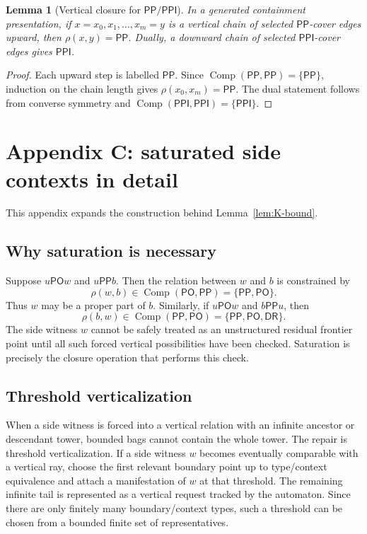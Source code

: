 \documentclass[11pt]{article}
\newtheorem{lemma}[theorem]{Lemma}
\newcommand{\PP}{\mathsf{PP}}
\newcommand{\PPI}{\mathsf{PPI}}
\newcommand{\PO}{\mathsf{PO}}
\newcommand{\DR}{\mathsf{DR}}
\newcommand{\Comp}{\operatorname{Comp}}
\begin{document}
\begin{lemma}[Vertical closure for $\PP/\PPI$]
In a generated containment presentation, if $x=x_0,x_1,\ldots,x_m=y$ is a vertical chain of selected $\PP$-cover edges upward, then $\rho(x,y)=\PP$.  Dually, a downward chain of selected $\PPI$-cover edges gives $\PPI$.
\end{lemma}

\begin{proof}
Each upward step is labelled $\PP$.  Since $\Comp(\PP,\PP)=\{\PP\}$, induction on the chain length gives $\rho(x_0,x_m)=\PP$.  The dual statement follows from converse symmetry and $\Comp(\PPI,\PPI)=\{\PPI\}$.
\end{proof}

\section{Appendix C: saturated side contexts in detail}

This appendix expands the construction behind Lemma~\ref{lem:K-bound}.

\subsection{Why saturation is necessary}

Suppose $u\PO w$ and $u\PP b$.  Then the relation between $w$ and $b$ is constrained by
\[
\rho(w,b)\in\Comp(\PO,\PP)=\{\PP,\PO\}.
\]
Thus $w$ may be a proper part of $b$.  Similarly, if $u\PO w$ and $b\PP u$, then
\[
\rho(b,w)\in\Comp(\PP,\PO)=\{\PP,\PO,\DR\}.
\]
The side witness $w$ cannot be safely treated as an unstructured residual frontier point until all such forced vertical possibilities have been checked.  Saturation is precisely the closure operation that performs this check.

\subsection{Threshold verticalization}

When a side witness is forced into a vertical relation with an infinite ancestor or descendant tower, bounded bags cannot contain the whole tower.  The repair is threshold verticalization.  If a side witness $w$ becomes eventually comparable with a vertical ray, choose the first relevant boundary point up to type/context equivalence and attach a manifestation of $w$ at that threshold.  The remaining infinite tail is represented as a vertical request tracked by the automaton.  Since there are only finitely many boundary/context types, such a threshold can be chosen from a bounded finite set of representatives.
\end{document}
